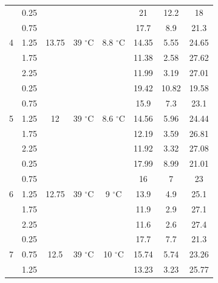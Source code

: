 \documentclass{article}
\begin{document}
\begin{center}
\begin{tabular}{|c|ccccccc|}
    \multirow{ 5}{*}{4}        & 0.25  & \multirow{ 5}{*}{13.75}         & \multirow{ 5}{*}{39 $^\circ$C}        & \multirow{ 5}{*}{8.8 $^\circ$C}        & 21    & 12.2    & 18          \\
           & 0.75  &     &         &        & 17.7  & 8.9     & 21.3        \\
           & 1.25  &     &         &        & 14.35 & 5.55    & 24.65       \\
           & 1.75  &     &         &       & 11.38 & 2.58    & 27.62       \\
           & 2.25  &     &         &        & 11.99 & 3.19    & 27.01       \\\hline
    \multirow{ 5}{*}{5}        & 0.25  & \multirow{ 5}{*}{12}            & \multirow{ 5}{*}{39 $^\circ$C}        & \multirow{ 5}{*}{8.6 $^\circ$C}        & 19.42 & 10.82   & 19.58       \\
           & 0.75  &        &         &        & 15.9  & 7.3     & 23.1        \\
           & 1.25  &        &         &        & 14.56 & 5.96    & 24.44       \\
           & 1.75  &       &         &        & 12.19 & 3.59    & 26.81       \\
           & 2.25  &        &         &       & 11.92 & 3.32    & 27.08       \\\hline
    \multirow{ 5}{*}{6}        & 0.25  & \multirow{ 5}{*}{12.75}        & \multirow{ 5}{*}{39 $^\circ$C}        & \multirow{ 5}{*}{9 $^\circ$C}          & 17.99 & 8.99    & 21.01       \\
           & 0.75  &     &         &          & 16    & 7       & 23          \\
           & 1.25  &     &         &         & 13.9  & 4.9     & 25.1        \\
           & 1.75  &     &         &          & 11.9  & 2.9     & 27.1        \\
           & 2.25  &     &         &          & 11.6  & 2.6     & 27.4        \\\hline
    \multirow{ 5}{*}{7}        & 0.25  & \multirow{ 5}{*}{12.5}          & \multirow{ 5}{*}{39 $^\circ$C}        & \multirow{ 5}{*}{10 $^\circ$C}         & 17.7  & 7.7     & 21.3        \\
           & 0.75  &      &         &         & 15.74 & 5.74    & 23.26       \\
           & 1.25  &      &         &         & 13.23 & 3.23    & 25.77       \\

\end{tabular}
\end{center}
\end{document}
